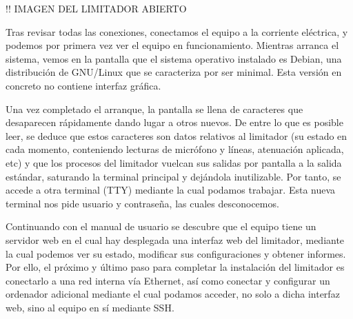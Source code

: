!! IMAGEN DEL LIMITADOR ABIERTO
\label{img:lms7_open}

Tras revisar todas las conexiones, conectamos el equipo a la corriente eléctrica, y podemos por primera vez ver el equipo en funcionamiento. Mientras arranca el sistema, vemos en la pantalla que el sistema operativo instalado es Debian, una distribución de \gls{GNU/Linux} que se caracteriza por ser minimal. Esta versión en concreto no contiene interfaz gráfica.

Una vez completado el arranque, la pantalla se llena de caracteres que desaparecen rápidamente dando lugar a otros nuevos. De entre lo que es posible leer, se deduce que estos caracteres son datos relativos al limitador (su estado en cada momento, conteniendo lecturas de micrófono y líneas, atenuación aplicada, etc) y que los procesos del limitador vuelcan sus salidas por pantalla a la salida estándar, saturando la terminal principal y dejándola inutilizable. Por tanto, se accede a otra terminal (TTY) mediante la cual podamos trabajar. Esta nueva terminal nos pide usuario y contraseña, las cuales desconocemos.

Continuando con el manual de usuario se descubre que el equipo tiene un servidor web en el cual hay desplegada una interfaz web del limitador, mediante la cual podemos ver su estado, modificar sus configuraciones y obtener informes. Por ello, el próximo y último paso para completar la instalación del limitador es conectarlo a una red interna vía Ethernet, así como conectar y configurar un ordenador adicional mediante el cual podamos acceder, no solo a dicha interfaz web, sino al equipo en sí mediante \acrshort{SSH}.


